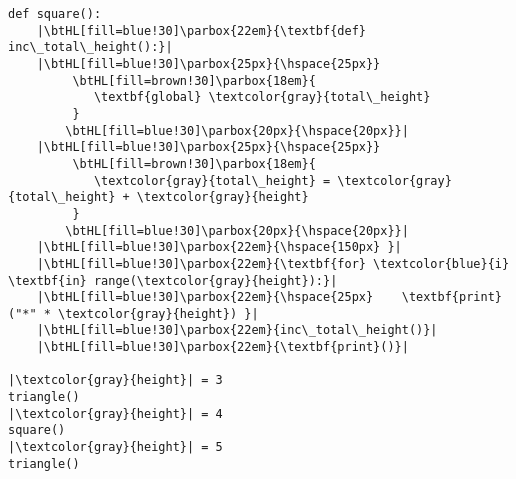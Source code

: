 \begin{lstlisting}[mathescape,escapechar=|]
def square():
    |\btHL[fill=blue!30]\parbox{22em}{\textbf{def} inc\_total\_height():}|
    |\btHL[fill=blue!30]\parbox{25px}{\hspace{25px}}
         \btHL[fill=brown!30]\parbox{18em}{
            \textbf{global} \textcolor{gray}{total\_height}
         }
        \btHL[fill=blue!30]\parbox{20px}{\hspace{20px}}|
    |\btHL[fill=blue!30]\parbox{25px}{\hspace{25px}}
         \btHL[fill=brown!30]\parbox{18em}{
            \textcolor{gray}{total\_height} = \textcolor{gray}{total\_height} + \textcolor{gray}{height}
         }
        \btHL[fill=blue!30]\parbox{20px}{\hspace{20px}}|
    |\btHL[fill=blue!30]\parbox{22em}{\hspace{150px} }|
    |\btHL[fill=blue!30]\parbox{22em}{\textbf{for} \textcolor{blue}{i} \textbf{in} range(\textcolor{gray}{height}):}|
    |\btHL[fill=blue!30]\parbox{22em}{\hspace{25px}    \textbf{print}("*" * \textcolor{gray}{height}) }|
    |\btHL[fill=blue!30]\parbox{22em}{inc\_total\_height()}|
    |\btHL[fill=blue!30]\parbox{22em}{\textbf{print}()}| 

|\textcolor{gray}{height}| = 3
triangle()
|\textcolor{gray}{height}| = 4
square()
|\textcolor{gray}{height}| = 5
triangle()
\end{lstlisting}
